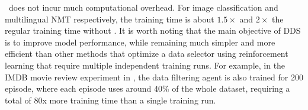 \dds~does not incur much computational overhead. For image classification and multilingual NMT respectively, the training time is about $1.5\times$ and $2\times$ the regular training time without \dds. It is worth noting that the main objective of DDS is to improve model performance, while remaining much simpler and more efficient than other methods that optimize a data selector using reinforcement learning that require multiple independent training runs. For example, in the IMDB movie review experiment in  \citet{learn_to_teach}, the data filtering agent is also trained for 200 episode, where each episode uses around 40\% of the whole dataset, requiring a total of 80x more training time than a single training run. 
